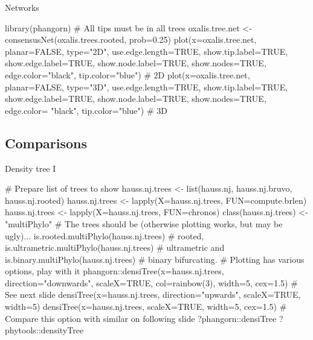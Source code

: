 \documentclass[compress, xelatex, 11pt, xcolor=svgnames, aspectratio=169,
	hyperref={
		bookmarks=true,
		unicode=true,
		colorlinks=true,
		pdftitle={Molecular data in R},
		plainpages=false,
		pdfauthor={Vojtech Zeisek},
		pdfsubject={Course about phylogeny and evolution in R},
		pdfcreator={XeLaTeX},
		pdfkeywords={R, evolution, phylogeny, molecular data},
		linkcolor=Crimson, %
		anchorcolor=Magenta, %
		citecolor=Magenta, %
		filecolor=Magenta, %
		menucolor=Magenta, %
		urlcolor=DodgerBlue, %
		},
	url={hyphens, lowtilde} %
	]{beamer}
\renewcommand{\texttt}[1]{\colorbox{Beige}{{\ttfamily #1}}}
\begin{document}
%

\begin{frame}[fragile]{Networks}
	\begin{spluscode}
    library(phangorn) # All tips must be in all trees
    oxalis.tree.net <- consensusNet(oxalis.trees.rooted, prob=0.25)
    plot(x=oxalis.tree.net, planar=FALSE, type="2D", use.edge.length=TRUE,
      show.tip.label=TRUE, show.edge.label=TRUE, show.node.label=TRUE,
      show.nodes=TRUE, edge.color="black", tip.color="blue") # 2D
    plot(x=oxalis.tree.net, planar=FALSE, type="3D", use.edge.length=TRUE,
      show.tip.label=TRUE, show.edge.label=TRUE, show.node.label=TRUE,
      show.nodes=TRUE, edge.color= "black", tip.color="blue") # 3D
	\end{spluscode}
	\begin{center}
		\texttt{[image: oxalis-net.png]}
	\end{center}
\end{frame}

\subsection{Comparisons}

\begin{frame}[fragile]{Density tree I}
	\begin{spluscode}
    # Prepare list of trees to show
    hauss.nj.trees <- list(hauss.nj, hauss.nj.bruvo, hauss.nj.rooted)
    hauss.nj.trees <- lapply(X=hauss.nj.trees, FUN=compute.brlen)
    hauss.nj.trees <- lapply(X=hauss.nj.trees, FUN=chronos)
    class(hauss.nj.trees) <- "multiPhylo"
    # The trees should be (otherwise plotting works, but may be ugly)...
    is.rooted.multiPhylo(hauss.nj.trees) # rooted,
    is.ultrametric.multiPhylo(hauss.nj.trees) # ultrametric and
    is.binary.multiPhylo(hauss.nj.trees) # binary bifurcating.
    # Plotting has various options, play with it
    phangorn::densiTree(x=hauss.nj.trees, direction="downwards",
      scaleX=TRUE, col=rainbow(3), width=5, cex=1.5) # See next slide
    densiTree(x=hauss.nj.trees, direction="upwards", scaleX=TRUE, width=5)
    densiTree(x=hauss.nj.trees, scaleX=TRUE, width=5, cex=1.5)
    # Compare this option with similar on following slide
    ?phangorn::densiTree
    ?phytools::densityTree
	\end{spluscode}
\end{frame}
\end{document}

